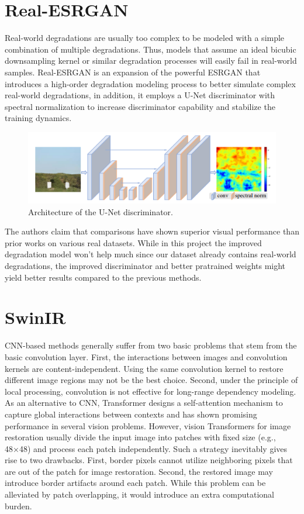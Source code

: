 \section{Real-ESRGAN}
\label{subsec:realesrgan}

Real-world degradations are usually too complex to be modeled with a simple combination of multiple degradations. Thus, models that assume an ideal bicubic
downsampling kernel or similar degradation processes will easily fail in real-world samples. Real-ESRGAN\cite{9711325} is an expansion of the powerful ESRGAN that introduces a high-order degradation modeling process to better simulate complex real-world degradations, in addition,
it employs a U-Net discriminator with spectral normalization to increase discriminator capability and stabilize the training dynamics.

\begin{figure}[H]
  \centering
  \includegraphics[scale=0.4]{figures/UNET.png}
  \caption{Architecture of the U-Net discriminator.\cite{wang2021realesrgan}}
  \label{img:UNET}
\end{figure}

The authors claim that comparisons have shown superior visual performance than prior works on various real datasets. While in this project the improved degradation model won't help much since our dataset already contains real-world degradations, the improved discriminator and better pratrained weights might yield better results compared to the previous methods.

\section{SwinIR}
\label{subsec:swinir}

CNN-based methods generally suffer from two basic
problems that stem from the basic convolution layer. First, the interactions between images and convolution kernels are content-independent. Using the same convolution kernel to restore different image regions may not be the best choice. Second, under the principle of local processing, convolution is not effective for long-range dependency modeling. As an alternative to CNN, Transformer designs a self-attention mechanism to capture global interactions between contexts and has shown promising performance in several vision problems. However, vision Transformers for image restoration usually divide the input image into patches with fixed size (e.g., 48×48) and process each patch independently. Such a strategy inevitably gives rise to two drawbacks. First, border pixels cannot utilize neighboring pixels that are out of the patch for image restoration. Second, the restored image may introduce border artifacts around each patch. While this problem can be alleviated by patch overlapping, it would introduce an extra computational burden.

